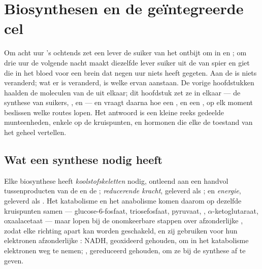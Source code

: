 \chapter{Biosynthesen en de geïntegreerde cel}\label{ch:b1:biosyntheses-integration}

Om acht uur 's ochtends zet een lever de suiker van het ontbijt om in  en
; om drie uur de volgende nacht maakt diezelfde lever suiker uit de 
van spier en giet die in het bloed voor een brein dat negen uur niets heeft
gegeten. Aan de  is niets veranderd; wat er is veranderd, is welke ervan
aanstaan. De vorige hoofdstukken haalden de moleculen van de  uit elkaar; dit
hoofdstuk zet ze in elkaar --- de synthese van suikers, ,  en
 --- en vraagt daarna hoe een , en een , op elk moment
beslissen welke routes lopen. Het antwoord is een kleine reeks gedeelde
munteenheden, enkele  op de kruispunten, en hormonen die elke  de
toestand van het geheel vertellen.

\section{Wat een synthese nodig heeft}

\begin{proposition}\label{prop:b1:biosyntheses-integration:needs}
Elke biosynthese heeft \emph{koolstofskeletten} nodig, ontleend aan een handvol
tussenproducten van de  en de ; \emph{reducerende kracht},
geleverd als ; en \emph{energie}, geleverd als . Het katabolisme en het
anabolisme komen daarom op dezelfde kruispunten samen --- glucose-6-fosfaat,
triosefosfaat, pyruvaat, , $\alpha$-ketoglutaraat, oxaalacetaat --- maar
lopen bij de onomkeerbare stappen over afzonderlijke , zodat elke richting
apart kan worden geschakeld, en zij gebruiken voor hun elektronen afzonderlijke
: NADH, geoxideerd gehouden, om in het katabolisme elektronen weg te
nemen; , gereduceerd gehouden, om ze bij de synthese af te geven.
\end{proposition}


